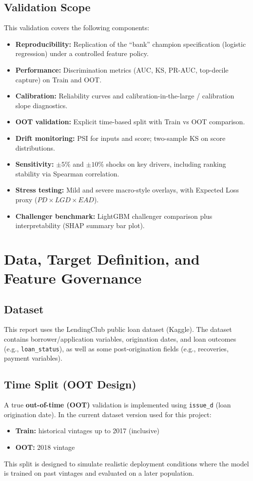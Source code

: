 \documentclass[11pt,a4paper]{article}
\begin{document}
\subsection{Validation Scope}
This validation covers the following components:
\begin{itemize}[leftmargin=*, itemsep=0.25em]
\item \textbf{Reproducibility:} Replication of the ``bank'' champion specification (logistic regression) under a controlled feature policy.
\item \textbf{Performance:} Discrimination metrics (AUC, KS, PR-AUC, top-decile capture) on Train and OOT.
\item \textbf{Calibration:} Reliability curves and calibration-in-the-large / calibration slope diagnostics.
\item \textbf{OOT validation:} Explicit time-based split with Train vs OOT comparison.
\item \textbf{Drift monitoring:} PSI for inputs and score; two-sample KS on score distributions.
\item \textbf{Sensitivity:} $\pm5\%$ and $\pm10\%$ shocks on key drivers, including ranking stability via Spearman correlation.
\item \textbf{Stress testing:} Mild and severe macro-style overlays, with Expected Loss proxy (\(PD \times LGD \times EAD\)).
\item \textbf{Challenger benchmark:} LightGBM challenger comparison plus interpretability (SHAP summary bar plot).
\end{itemize}

\section{Data, Target Definition, and Feature Governance}

\subsection{Dataset}
This report uses the LendingClub public loan dataset (Kaggle). The dataset contains borrower/application variables, origination dates, and loan outcomes (e.g., \texttt{loan\_status}), as well as some post-origination fields (e.g., recoveries, payment variables).

\subsection{Time Split (OOT Design)}
A true \textbf{out-of-time (OOT)} validation is implemented using \texttt{issue\_d} (loan origination date). In the current dataset version used for this project:
\begin{itemize}[leftmargin=*, itemsep=0.25em]
\item \textbf{Train:} historical vintages up to 2017 (inclusive)
\item \textbf{OOT:} 2018 vintage
\end{itemize}
This split is designed to simulate realistic deployment conditions where the model is trained on past vintages and evaluated on a later population.
\end{document}

